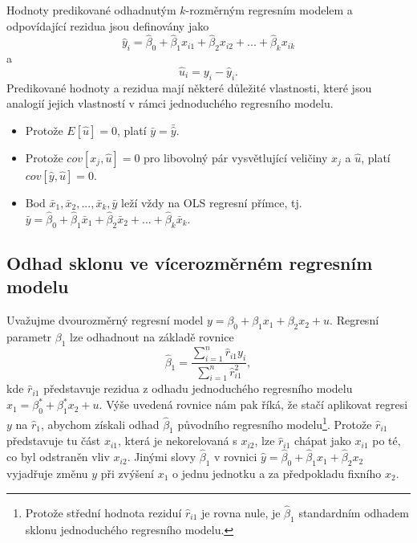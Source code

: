 Hodnoty predikované odhadnutým $k$-rozměrným regresním modelem  a odpovídající rezidua jsou definovány jako
\begin{equation}
\hat{y}_i = \hat{\beta}_0 + \hat{\beta}_1 x_{i1} + \hat{\beta}_2 x_{i2} + ... + \hat{\beta}_k x_{ik}
\end{equation}
a
\begin{equation}
\hat{u}_i = y_i - \hat{y}_i.
\end{equation}
Predikované hodnoty a rezidua mají některé důležité vlastnosti, které jsou analogií jejich vlastností v 
rámci jednoduchého regresního modelu.
\begin{itemize}
\item Protože $E[\hat{u}] = 0$, platí $\bar{y} = \bar{\hat{y}}$.
\item Protože $cov[x_j,\hat{u}] = 0$ pro libovolný pár vysvětlující veličiny $x_j$ a $\hat{u}$, platí 
$cov[\hat{y}, \hat{u}] = 0$.
\item Bod $\bar{x}_1, \bar{x}_2, ..., \bar{x}_k, \bar{y}$ leží vždy na OLS regresní přímce, tj. $\bar{y} = 
\hat{\beta}_0 + \hat{\beta}_1 \bar{x}_1 + \hat{\beta}_2 \bar{x}_2 + ... + \hat{\beta}_k \bar{x}_k$.
\end{itemize}

\subsection{Odhad sklonu ve vícerozměrném regresním modelu}

Uvažujme dvourozměrný regresní model $y = \beta_0 + \beta_1 x_1 + \beta_2 x_2 + u$. Regresní parametr $\beta_1$ lze odhadnout na základě rovnice
\begin{equation}
\hat{\beta}_1 = \frac{\sum_{i = 1}^n \hat{r}_{i1}y_i}{\sum_{i = 1}^n \hat{r}_{i1}^2},
\end{equation}
kde $\hat{r}_{i1}$ představuje rezidua z odhadu jednoduchého regresního modelu $x_1 = \beta_0^* + \beta_1^* x_2 + u$. 
Výše uvedená rovnice nám pak říká, že stačí aplikovat regresi $y$ na $\hat{r}_1$, abychom získali odhad 
$\hat{\beta}_1$ původního regresního modelu\footnote{Protože střední hodnota reziduí $\hat{r}_{i1}$ je rovna 
nule, je $\hat{\beta}_1$ standardním odhadem sklonu jednoduchého regresního modelu.}. Protože $\hat{r}_{i1}$ 
představuje tu část $x_{i1}$, která je nekorelovaná s $x_{i2}$, lze $\hat{r}_{i1}$ chápat jako $x_{i1}$ po té, 
co byl odstraněn vliv $x_{i2}$. Jinými slovy $\hat{\beta}_1$ v rovnici $\hat{y} = \hat{\beta}_0 + \hat{\beta}_1 x_1 + 
\hat{\beta}_2 x_2$ vyjadřuje změnu $y$ při zvýšení $x_1$ o jednu jednotku a za předpokladu fixního $x_2$.

